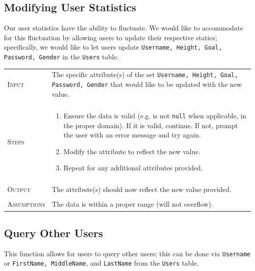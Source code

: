\documentclass{article}
\newcommand{\br}{\multicolumn{2}{c}{} \\}
\begin{document}
\subsection*{Modifying User Statistics}
Our user statistics have the ability to fluctuate. We would like to accommodate for this fluctuation by allowing users to update their respective statics; specifically, we would like to let users update \texttt{Username, Height, Goal, Password, Gender} in the \texttt{Users} table. \\

\noindent
\begin{tabular}{l|p{9.5cm}}
\textsc{Input} & The specific attribute(s) of the set \texttt{Username, Height, Goal, Password, Gender} that would like to be updated with the new value. \\
\br
\textsc{Steps} & \begin{enumerate}[topsep=0pt]
\item Ensure the data is valid (e.g. is not \texttt{null} when applicable, in the proper domain). If it is valid, continue. If not, prompt the user with an error message and try again.
\item Modify the attribute to reflect the new value.
\item Repeat for any additional attributes provided.
\end{enumerate}
\\
\br
\textsc{Output} & The attribute(s) should now reflect the new value provided. \\
\br
\textsc{Assumptions} & The data is within a proper range (will not overflow).
\end{tabular}


\subsection*{Query Other Users}
This function allows for users to query other users; this can be done via \texttt{Username} or \texttt{FirstName, MiddleName}, and \texttt{LastName} from the \texttt{Users} table. \\
\end{document}
